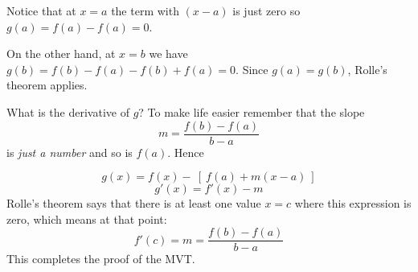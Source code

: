\documentclass[11pt, oneside]{article}
\begin{document}
Notice that at $x = a$ the term with $(x-a)$ is just zero so $g(a) = f(a) - f(a) = 0$.

On the other hand, at $x = b$ we have $g(b) = f(b) - f(a) - f(b) + f(a) = 0$.  Since $g(a) = g(b)$, Rolle's theorem applies.

What is the derivative of $g$?  To make life easier remember that the slope
\[ m = \frac{f(b) - f(a)}{b - a} \]
is \emph{just a number} and so is $f(a)$.  Hence

\[ g(x) = f(x) - \ [ \ f(a) + m(x-a) \ ] \]
\[ g'(x) = f'(x) - m \]
Rolle's theorem says that there is at least one value $x = c$ where this expression is zero, which means at that point:
\[ f'(c) = m = \frac{f(b) - f(a)}{b - a} \]
This completes the proof of the MVT.
\end{document}
